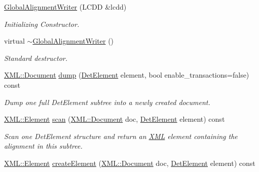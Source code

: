 \begin{DoxyCompactItemize}
\item 
\hyperlink{class_d_d4hep_1_1_alignments_1_1_global_alignment_writer_a11a20b65cc5391ee6b6f77cb38fb5703}{GlobalAlignmentWriter} (LCDD \&lcdd)
\begin{DoxyCompactList}\small\item\em Initializing Constructor. \item\end{DoxyCompactList}\item 
virtual \hyperlink{class_d_d4hep_1_1_alignments_1_1_global_alignment_writer_ac88d52ba1f9f66cd93b65b9464c9fd92}{$\sim$GlobalAlignmentWriter} ()
\begin{DoxyCompactList}\small\item\em Standard destructor. \item\end{DoxyCompactList}\item 
\hyperlink{class_d_d4hep_1_1_x_m_l_1_1_document}{XML::Document} \hyperlink{class_d_d4hep_1_1_alignments_1_1_global_alignment_writer_a5e57677f6c3ff8a881a1eb52bf296958}{dump} (\hyperlink{namespace_d_d4hep_a21dd977310ff183f61ca6ae14b59a989}{DetElement} element, bool enable\_\-transactions=false) const 
\begin{DoxyCompactList}\small\item\em Dump one full DetElement subtree into a newly created document. \item\end{DoxyCompactList}\item 
\hyperlink{class_d_d4hep_1_1_x_m_l_1_1_element}{XML::Element} \hyperlink{class_d_d4hep_1_1_alignments_1_1_global_alignment_writer_a1cd63b0381fcc67b4550630f61529ceb}{scan} (\hyperlink{class_d_d4hep_1_1_x_m_l_1_1_document}{XML::Document} doc, \hyperlink{namespace_d_d4hep_a21dd977310ff183f61ca6ae14b59a989}{DetElement} element) const 
\begin{DoxyCompactList}\small\item\em Scan one DetElement structure and return an \hyperlink{namespace_d_d4hep_1_1_x_m_l}{XML} element containing the alignment in this subtree. \item\end{DoxyCompactList}\item 
\hyperlink{class_d_d4hep_1_1_x_m_l_1_1_element}{XML::Element} \hyperlink{class_d_d4hep_1_1_alignments_1_1_global_alignment_writer_adbbbaaf880f8527c01332e7c50a304d3}{createElement} (\hyperlink{class_d_d4hep_1_1_x_m_l_1_1_document}{XML::Document} doc, \hyperlink{namespace_d_d4hep_a21dd977310ff183f61ca6ae14b59a989}{DetElement} element) const 

\end{DoxyCompactItemize}
